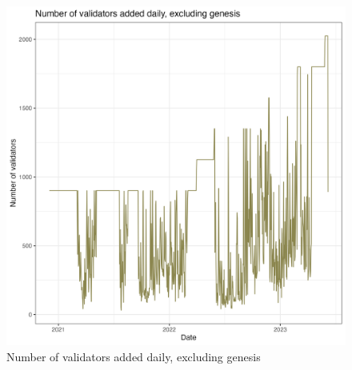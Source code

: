 \documentclass[UTF8]{article}
\begin{document}
\begin{figure}[htbp]
\begin{center}
\includegraphics[width=\linewidth]{images/daily_validator_plot_no_genesis_no_smoothing_230607}             %
\caption{Number of validators added daily, excluding genesis}
\label{fig:dailyvalidator2}
\end{center}
\end{figure}
\end{document}

